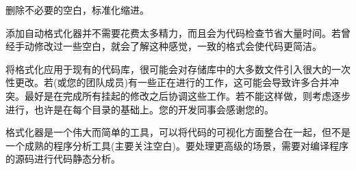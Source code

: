 删除不必要的空白，标准化缩进。

添加自动格式化器并不需要花费太多精力，而且会为代码检查节省大量时间。若曾经手动修改过一些空白，就会了解这种感觉，一致的格式会使代码更简洁。

\begin{tcolorbox}[colback=blue!5!white,colframe=blue!75!black,title=Note]
将格式化应用于现有的代码库，很可能会对存储库中的大多数文件引入很大的一次性更改。若(或您的团队成员)有一些正在进行的工作，这可能会导致许多合并冲突。最好是在完成所有挂起的修改之后协调这些工作。若不能这样做，则考虑逐步进行，也许是在每个目录的基础上。您的开发同事会感谢您的。
\end{tcolorbox}

格式化器是一个伟大而简单的工具，可以将代码的可视化方面整合在一起，但不是一个成熟的程序分析工具(主要关注空白)。要处理更高级的场景，需要对编译程序的源码进行代码静态分析。